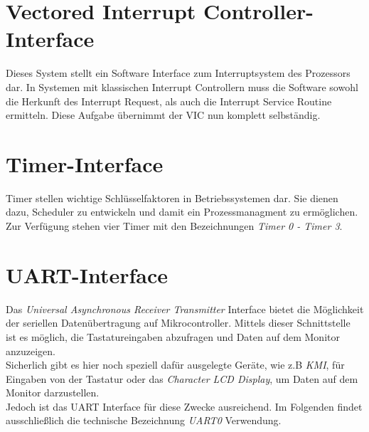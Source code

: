 \section{Vectored Interrupt Controller-Interface}
Dieses System stellt ein Software Interface zum Interruptsystem des Prozessors dar. In Systemen mit klassischen Interrupt Controllern muss die Software sowohl die Herkunft des Interrupt Request, als auch die Interrupt Service Routine ermitteln. Diese Aufgabe \"ubernimmt der VIC nun komplett selbst\"andig.
\section{Timer-Interface}
Timer stellen wichtige Schl\"usselfaktoren in Betriebssystemen dar. Sie dienen dazu, Scheduler zu entwickeln und damit ein Prozessmanagment zu erm\"oglichen. Zur Verf\"ugung stehen vier Timer mit den Bezeichnungen \textit{Timer 0 - Timer 3}.
\section{UART-Interface}
Das \textit{Universal Asynchronous Receiver Transmitter} Interface bietet die M\"oglichkeit der seriellen Daten\"ubertragung auf Mikrocontroller. Mittels dieser Schnittstelle ist es m\"oglich, die Tastatureingaben abzufragen und Daten auf dem Monitor anzuzeigen. \\
Sicherlich gibt es hier noch speziell daf\"ur ausgelegte Ger\"ate, wie z.B \textit{KMI}, f\"ur Eingaben von der Tastatur oder das \textit{Character LCD Display}, um Daten auf dem Monitor darzustellen.\\ Jedoch ist das UART Interface f\"ur diese Zwecke ausreichend. Im Folgenden findet ausschlie\ss lich die technische Bezeichnung \textit{UART0} Verwendung.